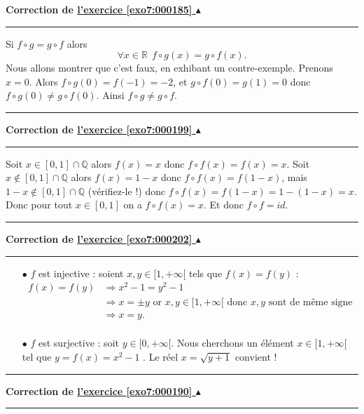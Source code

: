 \documentclass[11pt,a4paper]{article}
\newcommand{\Qq}{\mathbb{Q}} \newcommand{\Q}{\mathbb{Q}}
\newcommand{\Rr}{\mathbb{R}} \newcommand{\R}{\mathbb{R}}
\newcounter{exo}
\newcommand{\correction}[1]{\hypertarget{cor7:#1}{}\label{cor7:#1}{\bf Correction de \hyperlink{exo7:#1}{l'exercice \ref{exo7:#1} $\blacktriangle$}}\vspace{1mm}\hrule\vspace{1mm}}
\newcommand{\fincorrection}{\vspace{1mm}\hrule\vspace*{7mm}}
\begin{document}
\correction{000185}
Si $f\circ g=g\circ f$ alors 
$$\forall x \in \Rr \ \ f\circ g (x) = g\circ f(x).$$
Nous allons montrer que c'est faux, en exhibant un contre-exemple.
Prenons $x=0$. Alors $f\circ g (0) = f(-1) = -2$, et
$g\circ f(0) = g(1) = 0$ donc $f\circ g (0) \not= g\circ f(0)$.
Ainsi $f\circ g \not= g\circ f$.
\fincorrection
\correction{000199}
Soit $x\in [0,1]\cap\Qq$ alors $f(x) = x$ donc $f \circ f (x) = f(x) = x$.
Soit $x\notin [0,1]\cap\Qq$ alors $f(x) = 1-x$ donc $f \circ f (x) = f(1-x)$,
mais $1-x \notin [0,1]\cap\Qq$ (vérifiez-le !) donc  $f \circ f (x) = f(1-x) = 1 - (1-x) = x$.
Donc pour tout $x \in [0,1]$ on a  $f \circ f (x) = x$. Et donc $f \circ f= id$.
\fincorrection
\correction{000202}
\begin{itemize}
    \item[$\bullet$] $f$ est injective : soient $x,y \in [1,+\infty[$ tels que $f(x)=f(y)$ :
\begin{align*}
f(x)=f(y) &\Rightarrow x^2-1=y^2-1\\
&\Rightarrow x = \pm y \text{ or $x,y\in [1,+\infty[$ donc $x,y$ sont de m\^eme signe}\\
&\Rightarrow x =y.\\
\end{align*}

    \item[$\bullet$] $f$ est surjective : soit $y\in [0,+\infty[$.
Nous cherchons un \'el\'ement $x\in [1,+\infty[$ tel que $y = f(x)
= x^2-1$ . Le r\'eel $x= \sqrt{y+1}$ convient !
\end{itemize}
\fincorrection
\correction{000190}
\end{document}
